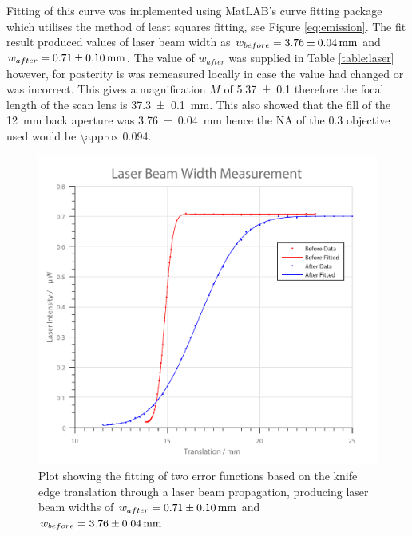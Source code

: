 Fitting of this curve was implemented using MatLAB's curve fitting package which utilises the method of least squares fitting, see Figure \ref{eq:emission}.
The fit result produced values of laser beam width as $w_{before} = \SI{3.76\pm0.04}{\milli\meter}$ and $w_{after} = \SI{0.71\pm0.1}{\milli\meter}$.
The value of $w_{after}$ was supplied in Table \ref{table:laser} however, for posterity is was remeasured locally in case the value had changed or was incorrect.
This gives a magnification $M$ of \SI{5.37 \pm 0.1}{} therefore the focal length of the scan lens is \SI{37.3\pm0.1}{\milli\meter}.
This also showed that the fill of the \SI{12}{\milli\meter} back aperture was \SI{3.76\pm0.04}{\milli\meter} hence the NA of the \num{0.3} objective used would be \SI{\approx 0.094}{}.

\begin{figure}
\centering
\includegraphics[width=0.7\linewidth]{./laser_width}
\caption[Laser Width Fitting]{Plot showing the fitting of two error functions based on the knife edge translation through a laser beam propagation, producing laser beam widths of $w_{after} = \SI{0.71\pm0.1}{\milli\meter}$ and $w_{before} = \SI{3.76\pm0.04}{\milli\meter}$}
\label{fig:laser_width}
\end{figure}
